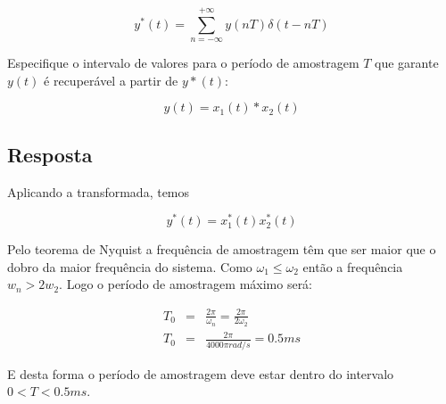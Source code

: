 \documentclass[a4paper,11pt]{article}
\begin{document}
$$y^*(t) = \sum^{+\infty}_{n=-\infty} y(nT)\delta(t-nT)$$

Especifique o intervalo de valores para o período de amostragem $T$ que garante $y(t)$ é recuperável a partir de $y*(t)$:

$$y(t)=x_1(t)*x_2(t)$$

\subsection{Resposta}

Aplicando a transformada, temos

$$y^*(t)=x_1^*(t)x_2^*(t)$$

Pelo teorema de Nyquist a frequência de amostragem têm que ser maior que o dobro da maior frequência do sistema. Como $\omega_1 \leq \omega_2$ então a frequência $w_n > 2w_2$. Logo o período de amostragem máximo será:

$$
\begin{array}{lcl}
     T_0 &=& \frac{2\pi}{\omega_n} = \frac{2\pi}{2\omega_2}  \\
     T_0 &=& \frac{2\pi}{4000\pi rad/s} = 0.5ms
\end{array}
$$

E desta forma o período de amostragem deve estar dentro do intervalo $0< T < 0.5 ms$.


%
%


\end{document}
